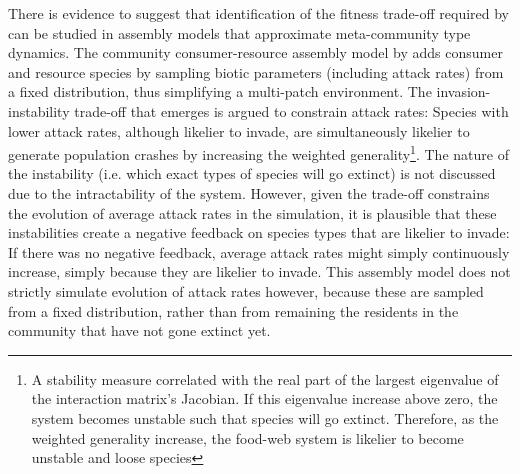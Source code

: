 \documentclass[a4paper]{report}
\begin{document}
There is evidence to suggest that identification of the fitness trade-off required by \citep{Goodnight2008} can be studied in assembly models that approximate meta-community type dynamics. The community consumer-resource assembly model by \citep{Pawar2009} adds consumer and resource species by sampling biotic parameters (including attack rates) from a fixed distribution, thus simplifying a multi-patch environment. The invasion-instability trade-off that emerges is argued to constrain attack rates: Species with lower attack rates, although likelier to invade, are simultaneously likelier to generate population crashes by increasing the weighted generality\footnote{A stability measure correlated with the real part of the largest eigenvalue of the interaction matrix's Jacobian. If this eigenvalue increase above zero, the system becomes unstable such that species will go extinct. Therefore, as the weighted generality increase, the food-web system is likelier to become unstable and loose species}. The nature of the instability (i.e. which exact types of species will go extinct) is not discussed due to the intractability of the system. However, given the trade-off constrains the evolution of average attack rates in the simulation, it is plausible that these instabilities create a negative feedback on species types that are likelier to invade: If there was no negative feedback, average attack rates might simply continuously increase, simply because they are likelier to invade. This assembly model does not strictly simulate evolution of attack rates however, because these are sampled from a fixed distribution, rather than from remaining the residents in the community that have not gone extinct yet. \\
\end{document}
